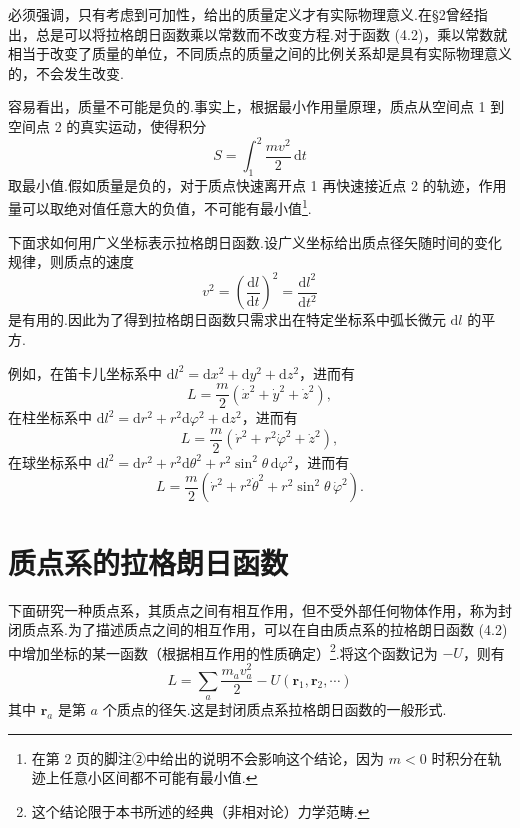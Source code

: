 必须强调，只有考虑到可加性，给出的质量定义才有实际物理意义.在§2曾经指出，总是可以将拉格朗日函数乘以常数而不改变方程.对于函数 (4.2)，乘以常数就相当于改变了质量的单位，不同质点的质量之间的比例关系却是具有实际物理意义的，不会发生改变.

容易看出，质量不可能是负的.事实上，根据最小作用量原理，质点从空间点 1 到空间点 2 的真实运动，使得积分
\begin{equation*}
  S=\int_1^2\frac{mv^2}{2}\,\mathrm{d}t
\end{equation*}
取最小值.假如质量是负的，对于质点快速离开点 1 再快速接近点 2 的轨迹，作用量可以取绝对值任意大的负值，不可能有最小值\footnote{在第 2 页的脚注②中给出的说明不会影响这个结论，因为 $m<0$ 时积分在轨迹上任意小区间都不可能有最小值.}.

下面求如何用广义坐标表示拉格朗日函数.设广义坐标给出质点径矢随时间的变化规律，则质点的速度
\begin{equation}
  v^2=\left(\frac{\mathrm{d}l}{\mathrm{d}t}\right)^2
  =\frac{\mathrm{d}l^2}{\mathrm{d}t^2}
\end{equation}
是有用的.因此为了得到拉格朗日函数只需求出在特定坐标系中弧长微元 $\mathrm{d}l$ 的平方.

例如，在笛卡儿坐标系中 $\mathrm{d}l^2=\mathrm{d}x^2+\mathrm{d}y^2+\mathrm{d}z^2$，进而有
\begin{equation}
  L=\frac{m}{2}\left(\dot{x}^2+\dot{y}^2+\dot{z}^2\right),
\end{equation}
在柱坐标系中 $\mathrm{d}l^2=\mathrm{d}r^2+r^2\mathrm{d}\varphi^2+\mathrm{d}z^2$，进而有
\begin{equation}
  L=\frac{m}{2}\left(\dot{r}^2+r^2\dot{\varphi}^2+\dot{z}^2\right),
\end{equation}
在球坐标系中 $\mathrm{d}l^2=\mathrm{d}r^2+r^2\mathrm{d}\theta^2+r^2\sin^2\theta\,\mathrm{d}\varphi^2$，进而有
\begin{equation}
  L=\frac{m}{2}\left(\dot{r}^2+r^2\dot{\theta}^2+r^2\sin^2\theta\,\dot{\varphi}^2\right).
\end{equation}

\section{质点系的拉格朗日函数}

下面研究一种质点系，其质点之间有相互作用，但不受外部任何物体作用，称为封闭质点系.为了描述质点之间的相互作用，可以在自由质点系的拉格朗日函数 (4.2) 中增加坐标的某一函数（根据相互作用的性质确定）\footnote{这个结论限于本书所述的经典（非相对论）力学范畴.}.将这个函数记为 $-U$，则有
\begin{equation}
  L=\sum_a\frac{m_a v_a^2}{2}-U(\boldsymbol{r}_1,\boldsymbol{r}_2,\cdots)
\end{equation}
其中 $\boldsymbol{r}_a$ 是第 $a$ 个质点的径矢.这是封闭质点系拉格朗日函数的一般形式.

